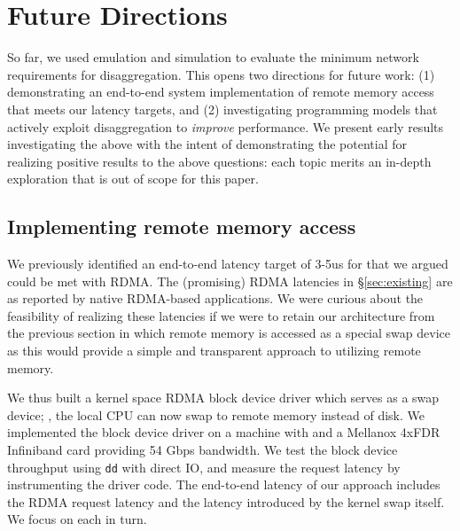 
\section{Future Directions}
\label{sec:future}


So far, we used emulation and simulation to evaluate the minimum network requirements for  disaggregation.%
This opens two directions for future work: (1) demonstrating an end-to-end system implementation of remote memory access that meets our latency targets, and (2) investigating programming models that actively exploit disaggregation to \emph{improve} performance.
We present early results investigating the above with the intent of demonstrating the potential for realizing positive results to the above questions: each topic merits an in-depth exploration that is out of scope for this paper.



\subsection{Implementing remote memory access}

We previously identified an end-to-end latency target of 3-5us for \dis that we argued could be met with RDMA. The (promising) RDMA latencies in \S\ref{sec:existing} are as reported by native RDMA-based applications. 
We were curious about the feasibility of realizing these latencies if we were to retain our architecture from the previous section in which remote memory is accessed as a special swap device as this would provide a simple and transparent approach to utilizing remote memory. 

We thus built a kernel space RDMA block device driver which serves as a swap device; \ie, the local CPU can now swap to remote memory instead of disk.
We implemented the block device driver on a machine with  and a Mellanox 4xFDR Infiniband card providing 54 Gbps bandwidth.
We test the block device throughput using \texttt{dd} with direct IO, and measure the request latency by instrumenting the driver code. 
The end-to-end latency of our approach includes the RDMA request latency and the latency introduced by the kernel swap itself. We focus on each in turn. 

